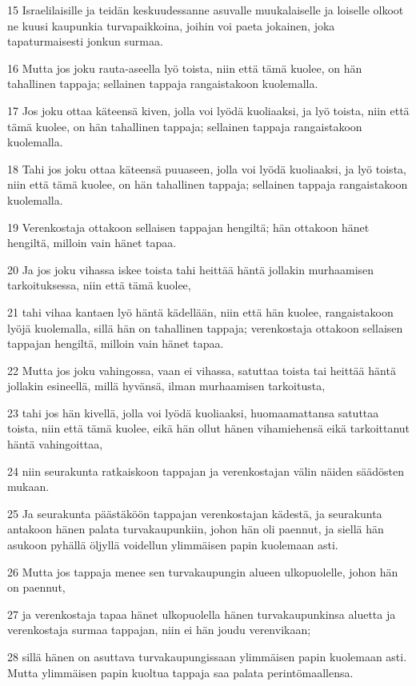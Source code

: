 \par 15 Israelilaisille ja teidän keskuudessanne asuvalle muukalaiselle ja loiselle olkoot ne kuusi kaupunkia turvapaikkoina, joihin voi paeta jokainen, joka tapaturmaisesti jonkun surmaa.
\par 16 Mutta jos joku rauta-aseella lyö toista, niin että tämä kuolee, on hän tahallinen tappaja; sellainen tappaja rangaistakoon kuolemalla.
\par 17 Jos joku ottaa käteensä kiven, jolla voi lyödä kuoliaaksi, ja lyö toista, niin että tämä kuolee, on hän tahallinen tappaja; sellainen tappaja rangaistakoon kuolemalla.
\par 18 Tahi jos joku ottaa käteensä puuaseen, jolla voi lyödä kuoliaaksi, ja lyö toista, niin että tämä kuolee, on hän tahallinen tappaja; sellainen tappaja rangaistakoon kuolemalla.
\par 19 Verenkostaja ottakoon sellaisen tappajan hengiltä; hän ottakoon hänet hengiltä, milloin vain hänet tapaa.
\par 20 Ja jos joku vihassa iskee toista tahi heittää häntä jollakin murhaamisen tarkoituksessa, niin että tämä kuolee,
\par 21 tahi vihaa kantaen lyö häntä kädellään, niin että hän kuolee, rangaistakoon lyöjä kuolemalla, sillä hän on tahallinen tappaja; verenkostaja ottakoon sellaisen tappajan hengiltä, milloin vain hänet tapaa.
\par 22 Mutta jos joku vahingossa, vaan ei vihassa, satuttaa toista tai heittää häntä jollakin esineellä, millä hyvänsä, ilman murhaamisen tarkoitusta,
\par 23 tahi jos hän kivellä, jolla voi lyödä kuoliaaksi, huomaamattansa satuttaa toista, niin että tämä kuolee, eikä hän ollut hänen vihamiehensä eikä tarkoittanut häntä vahingoittaa,
\par 24 niin seurakunta ratkaiskoon tappajan ja verenkostajan välin näiden säädösten mukaan.
\par 25 Ja seurakunta päästäköön tappajan verenkostajan kädestä, ja seurakunta antakoon hänen palata turvakaupunkiin, johon hän oli paennut, ja siellä hän asukoon pyhällä öljyllä voidellun ylimmäisen papin kuolemaan asti.
\par 26 Mutta jos tappaja menee sen turvakaupungin alueen ulkopuolelle, johon hän on paennut,
\par 27 ja verenkostaja tapaa hänet ulkopuolella hänen turvakaupunkinsa aluetta ja verenkostaja surmaa tappajan, niin ei hän joudu verenvikaan;
\par 28 sillä hänen on asuttava turvakaupungissaan ylimmäisen papin kuolemaan asti. Mutta ylimmäisen papin kuoltua tappaja saa palata perintömaallensa.
